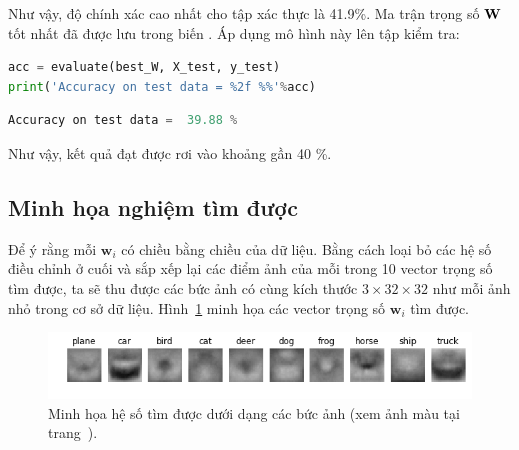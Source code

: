 Như vậy, độ chính xác cao nhất cho tập xác thực là 41.9\%. Ma trận trọng số $\mathbf{W}$
tốt nhất đã được lưu trong biến . Áp dụng mô hình này lên
tập kiểm tra:
\begin{lstlisting}[language=Python]
acc = evaluate(best_W, X_test, y_test)
print('Accuracy on test data = %2f %%'%acc)
\end{lstlisting}
\kq
\begin{lstlisting}[language=Python]
Accuracy on test data =  39.88 %
\end{lstlisting}
Như vậy, kết quả đạt được rơi vào khoảng gần 40 \%.







\subsection{Minh họa nghiệm tìm được}

Để ý rằng mỗi $\mathbf{w}_i$ có chiều bằng chiều của dữ liệu. Bằng cách loại bỏ các hệ số điều chỉnh ở cuối và sắp xếp lại các điểm ảnh của mỗi trong
10 vector trọng số tìm được, ta sẽ thu được các {bức ảnh} có cùng kích
thước $3\times 32\times32$ như mỗi ảnh nhỏ trong cơ sở dữ liệu.
Hình~\ref{fig:22_9} minh họa các vector trọng số $\mathbf{w}_i$ tìm được.
\begin{figure}[t]
\centering
\includegraphics[width = \textwidth]{Chapters/09_SupportVectorMachines/22_multiclasssvm/learned_ws_2_gray.png}
\caption[]{ Minh họa hệ số tìm được dưới dạng các bức ảnh (xem ảnh màu tại trang~\pageref{fig:22_9_c}).}
\label{fig:22_9}
\end{figure}


